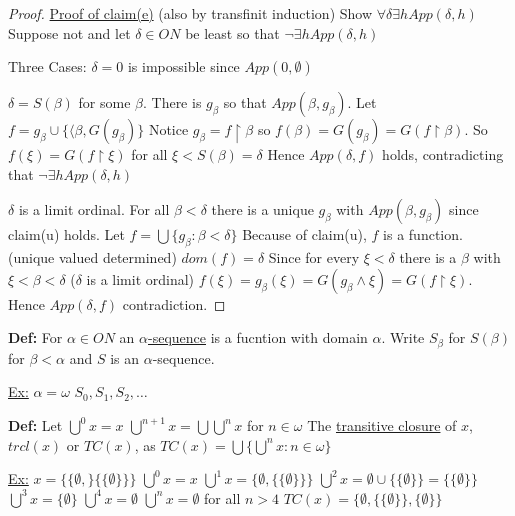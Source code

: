 \documentclass{article}
\newcommand{\set}[1]{\{#1\}}
\begin{document}
\begin{proof}
        \underline{Proof of claim(e)} (also by transfinit induction)
        Show $\forall \delta \exists h App(\delta,h)$
        Suppose not and let $\delta \in ON$ be least so that $\neg \exists h App(\delta,h)$

        Three Cases:
        $\delta = 0$ is impossible since $App(0,\emptyset)$

        $\delta = S(\beta)$ for some $\beta$.
        There is $g_{\beta}$ so that $App(\beta,g_{\beta})$.
        Let $f = g_{\beta} \cup \set{\langle \beta, G(g_{\beta})}$
        Notice $g_{\beta} = f \upharpoonright \beta$ so $f(\beta) = G(g_{\beta}) = G(f \upharpoonright \beta)$.
        So $f(\xi) = G(f \upharpoonright \xi)$ for all $\xi < S(\beta) = \delta$
        Hence $App(\delta,f)$ holds, contradicting that $\neg \exists h App(\delta,h)$

        $\delta$ is a limit ordinal.
        For all $\beta < \delta$ there is a unique $g_{\beta}$ with $App(\beta,g_{\beta})$ since claim(u) holds.
        Let $f = \bigcup \set{g_{\beta} : \beta < \delta}$
        Because of claim(u), $f$ is a function. (unique valued determined)
        $dom(f) = \delta$
        Since for every $\xi < \delta$ there is a $\beta$ with $\xi < \beta < \delta$ ($\delta$ is a limit ordinal)
        $f(\xi) = g_{\beta}(\xi) = G(g_{\beta} \wedge \xi) = G(f \upharpoonright \xi)$.
        Hence $App(\delta,f)$ contradiction.

    \end{proof}


    \textbf{Def:} For $\alpha \in ON$ an \underline{$\alpha$-sequence} is a fucntion with domain $\alpha$.
    Write $S_{\beta}$ for $S(\beta)$ for $\beta < \alpha$ and $S$ is an $\alpha$-sequence.

    \underline{Ex:} $\alpha = \omega$ $S_0,S_1,S_2, \dots$

    \textbf{Def:} Let $\bigcup^0 x = x$
    $\bigcup^{n+1} x = \bigcup \bigcup^n x$ for $n \in  \omega$
    The \underline{transitive closure} of $x$, $trcl(x)$ or $TC(x)$, as
    $TC(x) = \bigcup \set{\bigcup^n x : n \in \omega}$

    \underline{Ex:} $ x = \set{\set{\emptyset,}\set{\set{\emptyset}}}$
    $\bigcup^0 x = x$
    $\bigcup^1 x = \set{\emptyset,\set{\set{\emptyset}}}$
    $\bigcup^2 x = \emptyset \cup \set{\set{\emptyset}} = \set{\set{\emptyset}}$
    $\bigcup^3 x = \set{\emptyset}$
    $\bigcup^4 x = \emptyset$
    $\bigcup^n x = \emptyset$ for all $n > 4$
    $TC(x) = \set{\emptyset , \set{\set{\emptyset}},\set{\emptyset}}$
\end{document}

